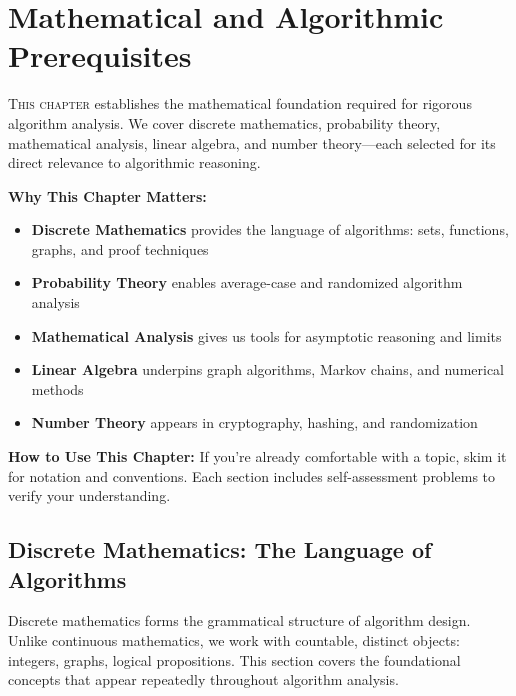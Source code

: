 
\chapter{Mathematical and Algorithmic Prerequisites}
\label{ch:prerequisites}

\lettrine[lines=3, lhang=0.1, loversize=0.15]{T}{his chapter} establishes 
the mathematical foundation required for rigorous algorithm analysis. We cover 
discrete mathematics, probability theory, mathematical analysis, linear algebra, 
and number theory—each selected for its direct relevance to algorithmic reasoning.

\begin{chapterintro}
\textbf{Why This Chapter Matters:}
\begin{itemize}[noitemsep]
    \item \textbf{Discrete Mathematics} provides the language of algorithms: sets, functions, graphs, and proof techniques
    \item \textbf{Probability Theory} enables average-case and randomized algorithm analysis
    \item \textbf{Mathematical Analysis} gives us tools for asymptotic reasoning and limits
    \item \textbf{Linear Algebra} underpins graph algorithms, Markov chains, and numerical methods
    \item \textbf{Number Theory} appears in cryptography, hashing, and randomization
\end{itemize}

\textbf{How to Use This Chapter:}
If you're already comfortable with a topic, skim it for notation and conventions.
Each section includes self-assessment problems to verify your understanding.
\end{chapterintro}

\section{Discrete Mathematics: The Language of Algorithms}
\label{sec:discrete-math}

\begin{sectionintro}
Discrete mathematics forms the grammatical structure of algorithm design.
Unlike continuous mathematics, we work with countable, distinct objects:
integers, graphs, logical propositions. This section covers the foundational
concepts that appear repeatedly throughout algorithm analysis.
\end{sectionintro}
